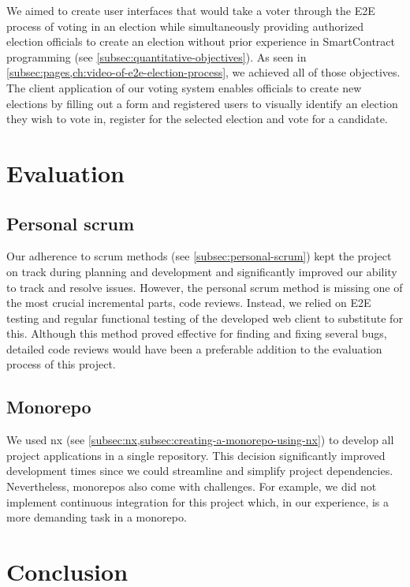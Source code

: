 We aimed to create user interfaces that would take a voter through the \gls{E2E} process of voting in an election while simultaneously providing authorized election officials to create an election without prior experience in \gls{SmartContract} programming (see \cref{subsec:quantitative-objectives}).
As seen in \cref{subsec:pages,ch:video-of-e2e-election-process}, we achieved all of those objectives.
The client application of our voting system enables officials to create new elections by filling out a form and registered users to visually identify an election they wish to vote in, register for the selected election and vote for a candidate.

\section{Evaluation}\label{sec:evalutaion}

\subsection{Personal scrum}\label{subsec:res-personal-scrum}

Our adherence to scrum methods (see \cref{subsec:personal-scrum}) kept the project on track during planning and development and significantly improved our ability to track and resolve issues.
However, the personal scrum method is missing one of the most crucial incremental parts, code reviews.
Instead, we relied on \gls{E2E} testing and regular functional testing of the developed web client to substitute for this.
Although this method proved effective for finding and fixing several bugs, detailed code reviews would have been a preferable addition to the evaluation process of this project.

\subsection{Monorepo}\label{subsec:monorepo}

We used nx (see \cref{subsec:nx,subsec:creating-a-monorepo-using-nx}) to develop all project applications in a single repository.
This decision significantly improved development times since we could streamline and simplify project dependencies.
Nevertheless, monorepos also come with challenges.
For example, we did not implement continuous integration for this project which, in our experience, is a more demanding task in a monorepo.

\section{Conclusion}\label{sec:conclusion}

